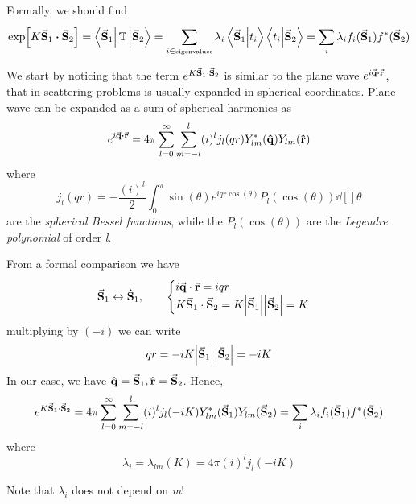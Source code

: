 \documentclass[../main/main.tex]{subfiles}
\begin{document}
Formally, we should find
\begin{equation*}
  \exp [K \va{S}_1\vdot \va{S}_{2}] = \bra{\va{S}_1} \mathbb{T} \ket{\va{S}_2} = \sum_{i \in \text{\tiny eigenvalues}}^{} \lambda _i \braket{\va{S}_1}{t_i}  \braket{t_i}{\va{S}_2}
  = \sum_{i}^{} \lambda _i f_i ( \va{S}_1) f^* (\va{S}_2)
\end{equation*}

\begin{remark}
  We start by noticing that the term \( e^{K \va{S}_1 \cdot \va{S}_2}  \) is similar to the plane wave \(e^{i \va{q}\vdot \va{r}}  \), that in scattering problems is usually expanded in spherical coordinates. Plane wave can be expanded as a sum of spherical harmonics as
  \begin{equation*}
    e^{i \va{q}\vdot \va{r}} = 4 \pi \sum_{l=0}^{\infty } \sum_{m=-l}^{l} (i)^l j_l (qr) Y_{lm}^* (\vu{q}) Y_{lm} (\vu{r})
  \end{equation*}
  where
  \begin{equation*}
    j_l (qr) = - \frac{(i)^l}{2} \int_{0}^{\pi} \sin(\theta ) e^{i q r \cos(\theta ) } P_l (\cos(\theta ) ) \dd[]{\theta }
  \end{equation*}
  are the \emph{spherical Bessel functions}, while  the \( P_l (\cos(\theta ) ) \) are the \emph{Legendre polynomial} of order \emph{l}.
\end{remark}

From a formal comparison we have
  \begin{equation}
    \va{S}_1 \leftrightarrow \vu{S}_1, \qquad
      \begin{cases}
           i \va{q}\cdot \va{r} = iqr \\
           K \va{S}_1 \cdot \va{S}_2 = K \abs{\va{S}_1} \abs{\va{S}_2} = K
      \end{cases}
  \end{equation}
  multiplying by \( (-i) \)  we can write
  \begin{equation}
    qr = -iK \abs{\va{S}_1} \abs{\va{S}_2} = -iK
  \end{equation}
  In our case, we have
  \( \vu{q} = \va{S}_1, \vu{r} = \va{S}_2 \). Hence,
  \begin{equation}
    e^{K \va{S}_1 \cdot \va{S}_2} = 4 \pi  \sum_{l=0}^{\infty } \sum_{m=-l}^{l} (i)^l j_l (-iK) Y_{lm}^* (\va{S}_1) Y_{lm} (\va{S}_2) = \sum_{i}^{} \lambda _i f_i (\va{S}_1) f^* (\va{S}_2)
  \end{equation}
where
\begin{equation}
  \lambda _i = \lambda _{lm} (K) = 4 \pi (i)^l j_l (-iK)
\end{equation}
\begin{remark}
Note that \( \lambda _i \) does not depend on \emph{m}!
\end{remark}
\end{document}

